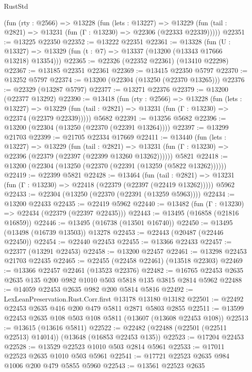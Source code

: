 \begin{lexlean}{RustStd}
\begin{coremodule}
    (fun (rty : @2566) =>
    @13228
      (fun (lets : @13227) =>
      @13229 (fun (tail : @2821) => @13231 (fun (Γ : @13230) => @22306 (@22333 @22339)))))
@22351 := @13225 @22350
@22352 := @13222 @22351
@22361 := @13328
    (fun (U : @13327) => @13329 (fun (t : @7) => @13337 (@13200 (@13343 @17666 @13218) @13354)))
@22365 := @22326 (@22352 @22361) (@13410 @22298)
@22367 := @13185 @22351 @22361
@22369 := @13415 @22350 @5797
@22370 := @13252 @5797
@22374 := @13200 (@22304 (@13250 (@22370 @13265)))
@22376 := @22329 (@13287 @5797)
@22377 := @13271 @22376
@22379 := @13200 (@22377 @13292)
@22390 := @13418
    (fun (rty : @2566) =>
    @13228
      (fun (lets : @13227) =>
      @13229 (fun (tail : @2821) => @13231 (fun (Γ : @13230) => @22374 (@22379 @22339)))))
    @5682
@22391 := @13256 @5682
@22396 := @13200 (@22304 (@13250 (@22370 (@22391 @13264))))
@22397 := @13299 @21703
@22399 := @21705 @22334 @17669
@22411 := @13440
    (fun (lets : @13227) =>
    @13229
      (fun (tail : @2821) =>
      @13231 (fun (Γ : @13230) => @22396 (@22379 (@22397 (@22399 @13260 @13262))))))
    @5821
@22418 := @13200 (@22304 (@13250 (@22370 (@22391 (@13259 (@5822 @13262))))))
@22419 := @22399 @5821
@22428 := @13464
    (fun (tail : @2821) => @13231 (fun (Γ : @13230) => @22418 (@22379 (@22397 (@22419 @13262)))))
    @5962
@22433 := @22304 (@13250 (@22370 (@22391 (@13259 @5963))))
@22434 := @13200 @22433
@22435 := @22419 @5962
@22440 := @13482 (fun (Γ : @13230) => @22434 (@22379 (@22397 @22435)))
@22443 := @13495 (@16858 (@21816 @16859))
@22446 := @13495 (@16738 (@13501 @16740))
@22450 := @13495 (@13498 (@16739 @13503)) @13278
@22453 := @22443 (@20487 (@22446 @22450))
@22454 := @22440 @22453
@22455 := @13366 @22433
@22457 := @22377 (@13291 @22453)
@22458 := @13200 @22457
@22461 := @13298 @22453 @21703 @22435
@22465 := @22455 (@22458 @22461) (@13518 @22303)
@22469 := @13366 @22457 @22461 (@13523 @22376)
@22482 := @16765 @22453 @2635 @2635 @135 @200 @982 @1010 @503 @5818 @135 @3815 @2814 @5962
@22488 := @14059 @22453 @2635 @982 @200 @5814 @5816
@22492 := LexLeanPreservation.Rust.Corr.first @13178 @13180 @13182
@22501 := @22492 @22453 @2635 @416 @200 @479 @5811 @2871 @5803 @2855
@22511 := @13599 @22453 @2635 @108 @503 @108 @5811 (@13607 (@13608 @22453 @108))
@22513 := @13615 (@13616 @5811)
@22522 := @22482 (@22488 (@22501 (@22511 @22513) @14014)) (@13648 (@16853 @22453 @135))
@22523 := @17204 @22453
@22528 := @13529 @22523 @1010 @503 @2814 @5961
@22533 := @17011 @22523 @2635 @1010 @503 @5961
@22541 := @17721 @22523 @2635 @984 @1006 @200 @479 @5855 @5960
@22543 := @13561 @22523 @2635

\end{coremodule}
\end{lexlean}
